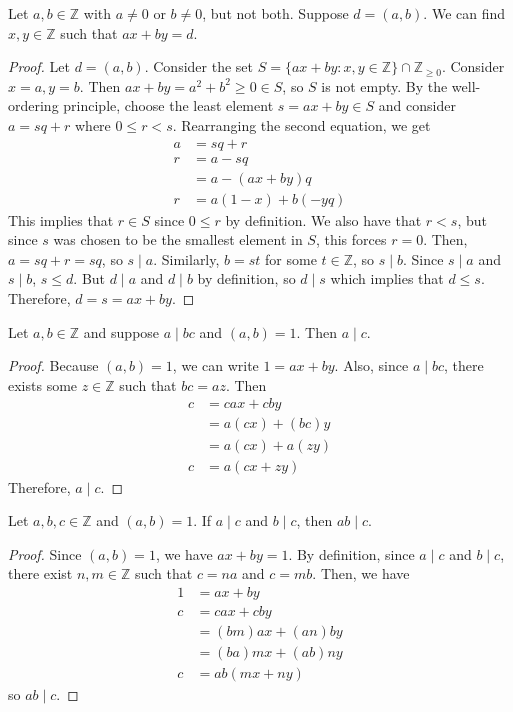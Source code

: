 \documentclass [12pt] {article}
\newcommand{\Z}{\mathbb{Z}}
\newenvironment{theorem}[1]{\begin{tcolorbox}[title={Theorem #1}]}{\end{tcolorbox}}
\newenvironment{corollary}[1]{\begin{tcolorbox}[title={Corollary #1}]}{\end{tcolorbox}}
\begin{document}
\begin{theorem}{(Bezout's Identity)}
    Let $a, b \in \Z$ with $a \neq 0$ or $b \neq 0$, but not both. Suppose $d = (a, b)$. We can find
    $x, y \in \Z$ such that $ax + by = d$.
\end{theorem}
\begin{proof}
    Let $d = (a, b)$. Consider the set $S = \{ ax + by : x, y \in \Z\} \cap \Z_{\geq 0}$. Consider
    $x = a, y = b$. Then $ax + by = a^2 + b^2 \geq 0 \in S$, so $S$ is not empty. By the
    well-ordering principle, choose the least element $s = ax + by \in S$ and consider $a = sq + r$
    where $0 \leq r < s$. Rearranging the second equation, we get
    \begin{align*}
        a &= sq + r \\
        r &= a - sq \\
          &= a - (ax + by)q \\
        r &= a(1 - x) + b(-yq)
    \end{align*}
    This implies that $r \in S$ since $0 \leq r$ by definition. We also have that $r < s$, but since
    $s$ was chosen to be the smallest element in $S$, this forces $r = 0$. Then, $a = sq + r = sq$,
    so $s \mid a$. Similarly, $b = st$ for some $t \in \Z$, so $s \mid b$. Since $s \mid a$ and $s \mid b$,  $s
    \leq d$. But $d \mid a$ and $d \mid b$ by definition, so $d \mid s$ which implies that $d \leq s$.
    Therefore, $d = s = ax + by$.
\end{proof}

\begin{theorem}{}
    Let $a, b \in \Z$ and suppose $a \mid bc$ and $(a, b) = 1$. Then $a \mid c$.
\end{theorem}
\begin{proof}
    Because $(a, b) = 1$, we can write $1 = ax + by$. Also, since $a \mid bc$, there exists some 
    $z \in \Z$ such that $bc = az$. Then 
    \begin{align*}
        c &= cax + cby \\
          &= a(cx) + (bc)y \\ 
          &= a(cx) + a(zy) \\ 
        c &= a(cx + zy)
    \end{align*}
    Therefore, $a \mid c$.
\end{proof}

\newpage
\begin{corollary}{}
    Let $a, b, c \in \Z$ and $(a, b) = 1$. If $a \mid c$ and $b \mid c$, then $ab \mid c$.
\end{corollary}
\begin{proof}
    Since $(a, b) = 1$, we have $ax + by = 1$. By definition, since $a \mid c$ and $b \mid c$, there exist
    $n, m \in \Z$ such that $c = na$ and $c = mb$. Then, we have
    \begin{align*}
        1 &= ax + by \\ 
        c &= cax + cby \\ 
          &= (bm)ax + (an)by \\ 
          &= (ba)mx + (ab)ny \\ 
        c &= ab(mx + ny) 
    \end{align*}
    so $ab \mid c$.
\end{proof}
\end{document}
